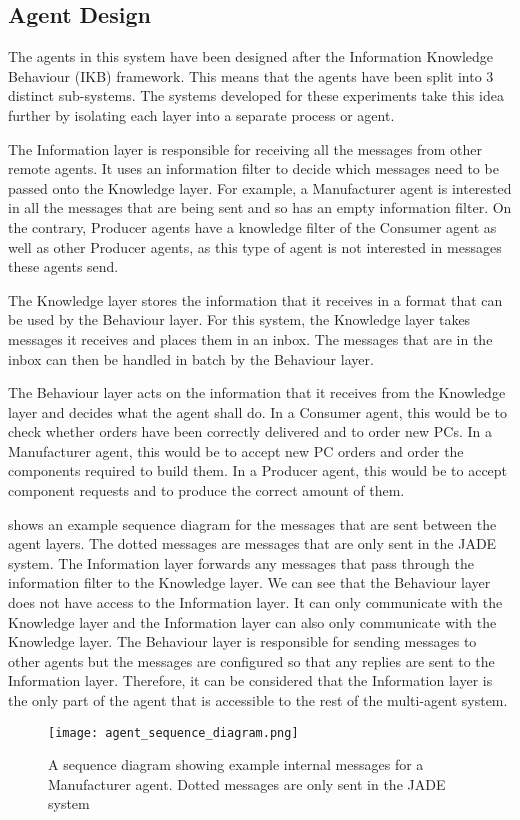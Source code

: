\subsection{Agent Design}

The agents in this system have been designed after the Information Knowledge Behaviour (IKB) framework.
This means that the agents have been split into 3 distinct sub-systems.
The systems developed for these experiments take this idea further by isolating each layer into a separate process or agent.

The Information layer is responsible for receiving all the messages from other remote agents.
It uses an information filter to decide which messages need to be passed onto the Knowledge layer.
For example, a Manufacturer agent is interested in all the messages that are being sent and so has an empty information filter.
On the contrary, Producer agents have a knowledge filter of the Consumer agent as well as other Producer agents, as this type of agent is not interested in messages these agents send.

The Knowledge layer stores the information that it receives in a format that can be used by the Behaviour layer.
For this system, the Knowledge layer takes messages it receives and places them in an inbox.
The messages that are in the inbox can then be handled in batch by the Behaviour layer.

The Behaviour layer acts on the information that it receives from the Knowledge layer and decides what the agent shall do.
In a Consumer agent, this would be to check whether orders have been correctly delivered and to order new PCs.
In a Manufacturer agent, this would be to accept new PC orders and order the components required to build them.
In a Producer agent, this would be to accept component requests and to produce the correct amount of them.

 shows an example sequence diagram for the messages that are sent between the agent layers.
The dotted messages are messages that are only sent in the JADE system.
The Information layer forwards any messages that pass through the information filter to the Knowledge layer.
We can see that the Behaviour layer does not have access to the Information layer.
It can only communicate with the Knowledge layer and the Information layer can also only communicate with the Knowledge layer.
The Behaviour layer is responsible for sending messages to other agents but the messages are configured so that any replies are sent to the Information layer.
Therefore, it can be considered that the Information layer is the only part of the agent that is accessible to the rest of the multi-agent system.

\begin{figure}[ht]
    \centering
    \texttt{[image: agent\_sequence\_diagram.png]}
    \caption{A sequence diagram showing example internal messages for a Manufacturer agent. Dotted messages are only sent in the JADE system}\label{fig:agent_sequence_diagram}
\end{figure}
